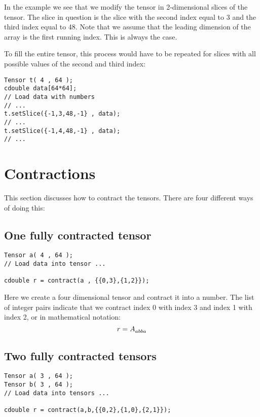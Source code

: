 \documentclass[paper=a4, oneside]{memoir}
\newcommand{\tens}[2]{\tensor{#1}{#2}}
\begin{document}
In the example we see that we modify the tensor in 2-dimensional slices of the 
tensor. The slice in question is the slice with the second index equal to 3 and 
the third index equal to 48. Note that we assume that the leading dimension of 
the array is the first running index. This is always the case.

To fill the entire tensor, this process would have to be repeated for slices 
with all possible values of the second and third index:

\begin{lstlisting}
Tensor t( 4 , 64 );
cdouble data[64*64];
// Load data with numbers
// ...
t.setSlice({-1,3,48,-1} , data); 
// ...
t.setSlice({-1,4,48,-1} , data); 
// ...
\end{lstlisting}


\section*{Contractions}

This section discusses how to contract the tensors. There are four different 
ways of doing this:

\subsection*{One fully contracted tensor}

\begin{lstlisting}
Tensor a( 4 , 64 );
// Load data into tensor ...

cdouble r = contract(a , {{0,3},{1,2}});
\end{lstlisting}

Here we create a four dimensional tensor and contract it into a number. The 
list of integer pairs indicate that we contract index 0 with index 3 and index 
1 with index 2, or in mathematical notation:
\begin{equation}
r = \tens{A}{_a_b_b_a}
\end{equation}


\subsection*{Two fully contracted tensors}

\begin{lstlisting}
Tensor a( 3 , 64 );
Tensor b( 3 , 64 );
// Load data into tensors ...

cdouble r = contract(a,b,{{0,2},{1,0},{2,1}});
\end{lstlisting}
\end{document}
